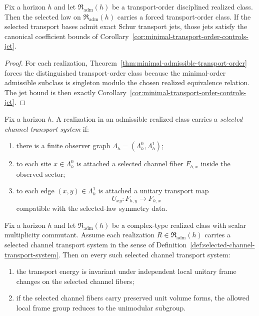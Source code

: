 \begin{corollary}
\label{cor:realized-transport-order-forcing}
Fix a horizon $h$ and let $\mathfrak R_{\mathrm{adm}}(h)$ be a transport-order
disciplined realized class. Then the selected law on
$\mathfrak R_{\mathrm{adm}}(h)$ carries a forced transport-order class. If the
selected transport bases admit exact Schur transport jets, those jets satisfy
the canonical coefficient bounds of
Corollary~\ref{cor:minimal-transport-order-controls-jet}.
\end{corollary}

\begin{proof}
For each realization, Theorem~\ref{thm:minimal-admissible-transport-order}
forces the distinguished transport-order class because the minimal-order
admissible subclass is singleton modulo the chosen realized equivalence
relation. The jet bound is then exactly
Corollary~\ref{cor:minimal-transport-order-controls-jet}.
\end{proof}

\begin{definition}
\label{def:selected-channel-transport-system}
Fix a horizon $h$. A realization in an admissible realized class carries a
\emph{selected channel transport system} if:
\begin{enumerate}[label=(\roman*), leftmargin=2em, itemsep=0.2em]
\item there is a finite observer graph $\Lambda_h=(\Lambda_h^0,\Lambda_h^1)$;
\item to each site $x\in\Lambda_h^0$ is attached a selected channel fiber
      $F_{h,x}$ inside the observed sector;
\item to each edge $(x,y)\in\Lambda_h^1$ is attached a unitary transport map
      \[
      U_{xy}:F_{h,y}\to F_{h,x}
      \]
      compatible with the selected-law symmetry data.
\end{enumerate}
\end{definition}

\begin{corollary}
\label{cor:realized-local-gauge-covariance}
Fix a horizon $h$ and let $\mathfrak R_{\mathrm{adm}}(h)$ be a complex-type
realized class with scalar multiplicity commutant. Assume each realization
$R\in\mathfrak R_{\mathrm{adm}}(h)$ carries a selected channel transport system
in the sense of Definition~\ref{def:selected-channel-transport-system}. Then on
every such selected channel transport system:
\begin{enumerate}[label=(\roman*), leftmargin=2em, itemsep=0.2em]
\item the transport energy is invariant under independent local unitary frame
      changes on the selected channel fibers;
\item if the selected channel fibers carry preserved unit volume forms, the
      allowed local frame group reduces to the unimodular subgroup.
\end{enumerate}
\end{corollary}

